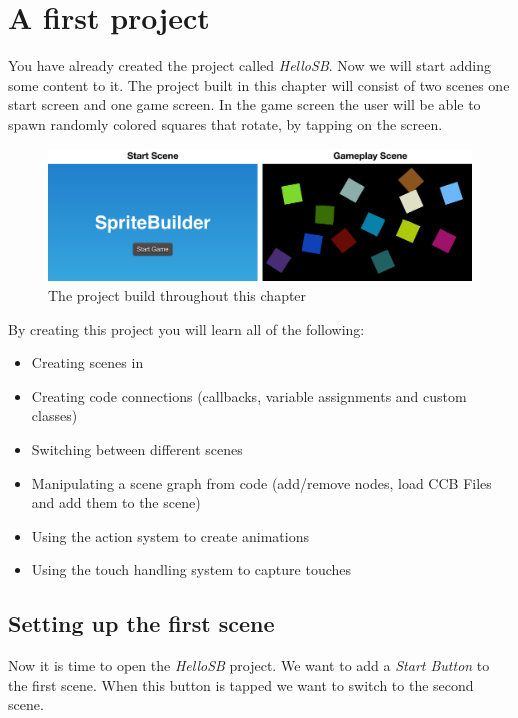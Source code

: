 \section{A first \SB{} project} 
You have already created the \SB{} project called \textit{HelloSB}. Now we will
start adding some content to it. The project built in this chapter will consist
of two scenes one start screen and one game screen. In the game screen the user will be able to spawn randomly
colored squares that rotate, by tapping on the screen.
\begin{figure}[H]
		\centering
		\includegraphics[width=0.9\linewidth]{images/firstproject/first_project.png}
		\caption{The project build throughout this chapter}
\end{figure}
By creating this project you will learn all of the following:
\begin{itemize}
  \item Creating scenes in \SB{}
  \item Creating code connections (callbacks, variable assignments and custom
  classes)
  \item Switching between different scenes
  \item Manipulating a scene graph from code (add/remove nodes, load CCB Files
  and add them to the scene)
  \item Using the \cocos{} action system to create animations
  \item Using the \cocos{} touch handling system to capture touches
\end{itemize}

\subsection{Setting up the first scene}
Now it is time to open the \textit{HelloSB} \SB{} project. We want to add a
\textit{Start Button} to the first scene. When this button is tapped we want to
switch to the second scene. 

